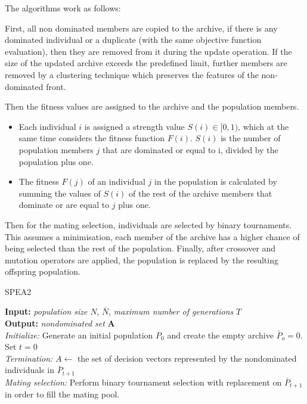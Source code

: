 The algorithms work as follows:

First, all non dominated members are copied to the archive, if there is any dominated individual or a duplicate (with the same objective function evaluation), then they are removed from it during the update operation. If the size of the updated archive exceeds the predefined limit, further members are removed by a clustering technique which preserves the features of the non-dominated front. 

Then the fitness values are assigned to the archive and the population members. 
\begin{itemize}
    \item Each individual $i$ is assigned a strength value $S(i) \in [0, 1)$, which  at the same time considers the fitness function $F(i)$. $S(i)$ is the number of population members $j$ that are dominated or equal to i, divided by the population plus one.
    \item The fitness $F(j)$ of an individual $j$ in the population is calculated by summing the values of $S(i)$ of the rest of the archive members that dominate or are equal to $j$ plus one.
\end{itemize}

Then for the mating selection, individuals are selected by binary tournaments. This assumes a minimisation, each member of the archive has a higher chance of being selected than the rest of the population. Finally, after crossover and mutation operators are applied, the population is replaced by the resulting offspring population.

\begin{algorithm}[H]
\label{spea2_alg}
\caption{SPEA2}
\SetAlgoLined
\textbf{Input:} \textit{population size} $N$,  $\bar N$, \textit{maximum number of generations} $T$\;\\
\textbf{Output:} \textit{nondominated set} \textbf{A}\;\\
\textit{Initialize:} Generate an initial population $P_0$ and create the empty archive $\bar P_o = 0.$ Set $t = 0$\;\\
\textit{Termination:} $A \gets$ the set of decision vectors represented by the nondominated individuals in $\bar P_{t+1}$\;\\
\textit{Mating selection:} Perform binary tournament selection with replacement on $\bar P_{t+1}$ in order to fill the mating pool.
\end{algorithm}

